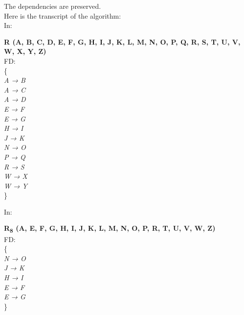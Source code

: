 The dependencies are preserved.\\

Here is the transcript of the algorithm:\\

In:\\

\begin{adjustwidth}{2cm}{}
\textbf{R (A, B, C, D, E, F, G, H, I, J, K, L, M, N, O, P, Q, R, S, T, U, V, W, X, Y, Z)}\\
FD: \\
\{ \\
\textit{
A → B\\
A → C\\
A → D\\
E → F\\
E → G\\
H → I\\
J → K\\
N → O\\
P → Q\\
R → S\\
W → X\\
W → Y\\
}
\}\\
\end{adjustwidth}
 





In:\\

\begin{adjustwidth}{2cm}{}
\textbf{R\textsubscript{8} (A, E, F, G, H, I, J, K, L, M, N, O, P, R, T, U, V, W, Z)}\\
FD:\\
\{\\
\textit{ 
N → O\\
J → K\\
H → I\\
E → F\\
E → G\\
}
\} \\
\end{adjustwidth}
























